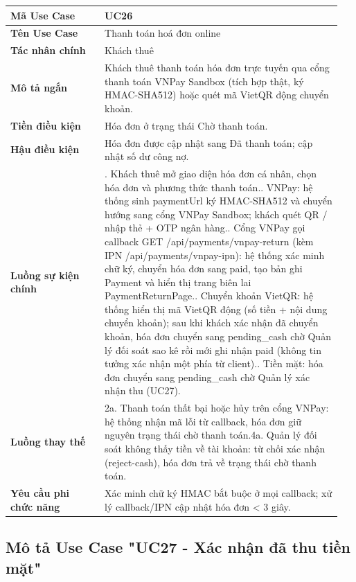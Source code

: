 \documentclass[a4paper,oneside]{report}
\begin{document}
\begin{longtable}[]{@{}>{\RaggedRight\arraybackslash}p{0.27\linewidth}>{\RaggedRight\arraybackslash}p{0.68\linewidth}@{}}
\toprule
\textbf{Mã Use Case} & UC26\tabularnewline
\midrule
\endhead
\textbf{Tên Use Case} & Thanh toán hoá đơn online\tabularnewline
\textbf{Tác nhân chính} & Khách thuê\tabularnewline
\textbf{Mô tả ngắn} & Khách thuê thanh toán hóa đơn trực tuyến qua cổng
thanh toán VNPay Sandbox (tích hợp thật, ký HMAC-SHA512) hoặc quét mã
VietQR động chuyển khoản.\tabularnewline
\textbf{Tiền điều kiện} & Hóa đơn ở trạng thái Chờ thanh
toán.\tabularnewline
\textbf{Hậu điều kiện} & Hóa đơn được cập nhật sang Đã thanh toán; cập
nhật số dư công nợ.\tabularnewline
\textbf{Luồng sự kiện chính} & 1. Khách thuê mở giao
diện hóa đơn cá nhân, chọn hóa đơn và phương thức thanh
toán.\newline 2. VNPay: hệ thống sinh paymentUrl ký HMAC-SHA512 và
chuyển hướng sang cổng VNPay Sandbox; khách quét QR / nhập thẻ + OTP
ngân hàng.\newline 3. Cổng VNPay gọi callback GET
/api/payments/vnpay-return (kèm IPN /api/payments/vnpay-ipn): hệ thống
xác minh chữ ký, chuyển hóa đơn sang paid, tạo bản ghi Payment và hiển
thị trang biên lai PaymentReturnPage.\newline 4. Chuyển khoản
VietQR: hệ thống hiển thị mã VietQR động (số tiền + nội dung chuyển
khoản); sau khi khách xác nhận đã chuyển khoản, hóa đơn chuyển sang
pending\_cash chờ Quản lý đối soát sao kê rồi mới ghi nhận paid (không
tin tưởng xác nhận một phía từ client).\newline 5. Tiền mặt: hóa
đơn chuyển sang pending\_cash chờ Quản lý xác nhận thu
(UC27).\tabularnewline
\textbf{Luồng thay thế} & 2a. Thanh toán thất bại
hoặc hủy trên cổng VNPay: hệ thống nhận mã lỗi từ callback, hóa đơn giữ
nguyên trạng thái chờ thanh toán.\newline 4a. Quản lý đối soát
không thấy tiền về tài khoản: từ chối xác nhận (reject-cash), hóa đơn
trả về trạng thái chờ thanh toán.\tabularnewline
\textbf{Yêu cầu phi chức năng} & Xác minh chữ ký HMAC bắt buộc ở mọi
callback; xử lý callback/IPN cập nhật hóa đơn \textless{} 3
giây.\tabularnewline
\bottomrule
\end{longtable}

\subsection{Mô tả Use Case "UC27 - Xác nhận đã thu tiền mặt"}
\end{document}
